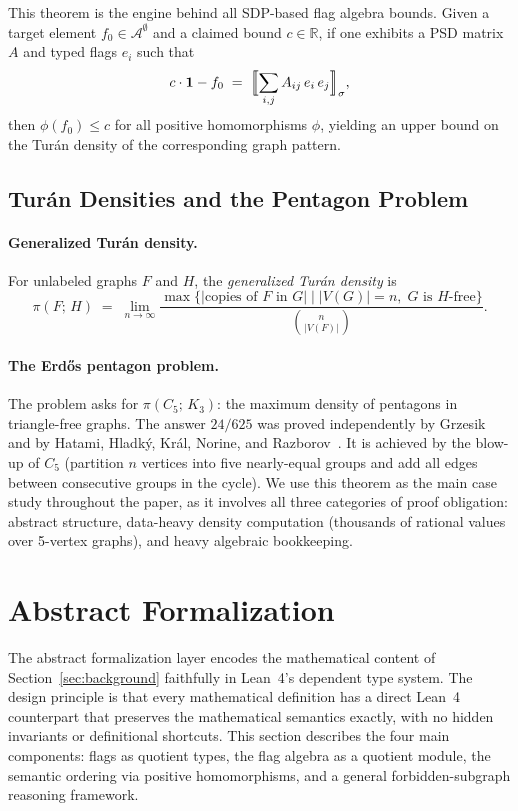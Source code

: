 \documentclass{article}
\newcommand{\tdensity}[2]{\pi(#1;\,#2)}
\begin{document}
This theorem is the engine behind all SDP-based flag algebra bounds.
Given a target element $f_0 \in \mathcal{A}^\emptyset$ and a claimed bound
$c \in \mathbb{R}$, if one exhibits a PSD matrix $A$ and typed flags $e_i$ such
that
\[
  c \cdot \mathbf{1} - f_0
  \;=\;
  \Bigl\llbracket \sum_{i,j} A_{ij}\, e_i\, e_j \Bigr\rrbracket_\sigma,
\]
then $\phi(f_0) \leq c$ for all positive homomorphisms $\phi$, yielding an
upper bound on the Turán density of the corresponding graph pattern.

\subsection{Turán Densities and the Pentagon Problem}

\paragraph{Generalized Turán density.}
For unlabeled graphs $F$ and $H$, the \emph{generalized Turán density} is
\[
  \tdensity{F}{H}
  \;=\;
  \lim_{n\to\infty}
  \frac{\max\bigl\{|\text{copies of }F\text{ in }G|
                   \mid |V(G)|=n,\; G \text{ is }H\text{-free}\bigr\}}
       {\binom{n}{|V(F)|}}.
\]

\paragraph{The Erd\H{o}s pentagon problem.}
The problem asks for $\tdensity{C_5}{K_3}$: the maximum density of
pentagons in triangle-free graphs.  The answer $24/625$ was proved
independently by Grzesik~\cite{grzesik2012} and by Hatami, Hladk\'y, Kr\'al,
Norine, and Razborov~\cite{hatami2012}.  It is achieved by the blow-up of
$C_5$ (partition $n$ vertices into five nearly-equal groups and add all edges
between consecutive groups in the cycle).  We use this theorem as the main
case study throughout the paper, as it involves all three categories of proof
obligation: abstract structure, data-heavy density computation (thousands of
rational values over 5-vertex graphs), and heavy algebraic bookkeeping.


\section{Abstract Formalization}
\label{sec:abstract}

The abstract formalization layer encodes the mathematical content of
Section~\ref{sec:background} faithfully in Lean~4's dependent type system.
The design principle is that every mathematical definition has a direct
Lean~4 counterpart that preserves the mathematical semantics exactly,
with no hidden invariants or definitional shortcuts.  This section describes
the four main components: flags as quotient types, the flag algebra as a
quotient module, the semantic ordering via positive homomorphisms, and a
general forbidden-subgraph reasoning framework.
\end{document}
